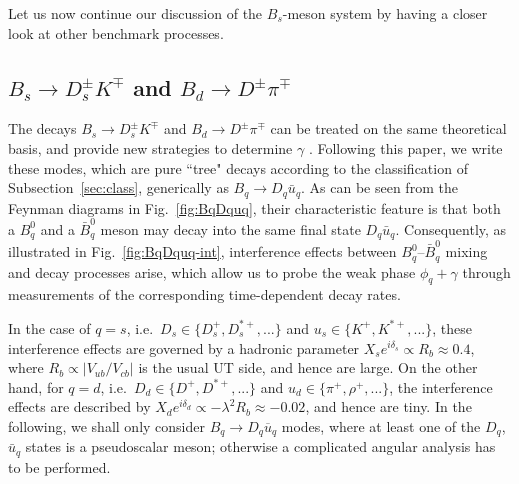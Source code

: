 \documentclass[12pt]{article}
\begin{document}
Let us now continue our discussion of the $B_s$-meson system by having
a closer look at other benchmark processes.


%
%
%
\boldmath
\subsection{$B_s\to D_s^\pm K^\mp$ and $B_d\to D^\pm \pi^\mp$}\label{ssec:BsDsK}
\unboldmath
%
%
%
The decays $B_s\to D_s^\pm K^\mp$ \cite{BsDsK} and $B_d\to D^\pm \pi^\mp$
\cite{BdDpi} can be 
treated on the same theoretical basis, and provide new strategies to determine 
$\gamma$ \cite{RF-gam-ca}. Following this paper, we write these modes, which 
are pure ``tree" decays according to the classification of 
Subsection~\ref{sec:class}, generically as $B_q\to D_q \bar u_q$. 
As can be seen from the Feynman diagrams in Fig.~\ref{fig:BqDquq}, their
characteristic feature is that both a $B^0_q$ and a $\bar B^0_q$ meson may decay 
into the same final state $D_q \bar u_q$. Consequently,  as illustrated in 
Fig.~\ref{fig:BqDquq-int}, interference effects between $B^0_q$--$\bar B^0_q$ 
mixing and decay processes arise, which allow us to probe the weak phase 
$\phi_q+\gamma$ through measurements of the corresponding time-dependent
decay rates. 

In the case of $q=s$, i.e.\ $D_s\in\{D_s^+, D_s^{\ast+}, ...\}$ and 
$u_s\in\{K^+, K^{\ast+}, ...\}$, these interference effects are governed 
by a hadronic parameter $X_s e^{i\delta_s}\propto R_b\approx0.4$, where
$R_b\propto |V_{ub}/V_{cb}|$ is the usual UT side, and hence are large. 
On the other hand, for $q=d$, i.e.\ $D_d\in\{D^+, D^{\ast+}, ...\}$ 
and $u_d\in\{\pi^+, \rho^+, ...\}$, the interference effects are described 
by $X_d e^{i\delta_d}\propto -\lambda^2R_b\approx-0.02$, and hence are tiny. 
In the following, we shall only consider $B_q\to D_q \overline{u}_q$ modes, 
where at least one of the $D_q$, $\bar u_q$ states is a pseudoscalar 
meson; otherwise a complicated angular analysis has to be performed.
 
\end{document}
